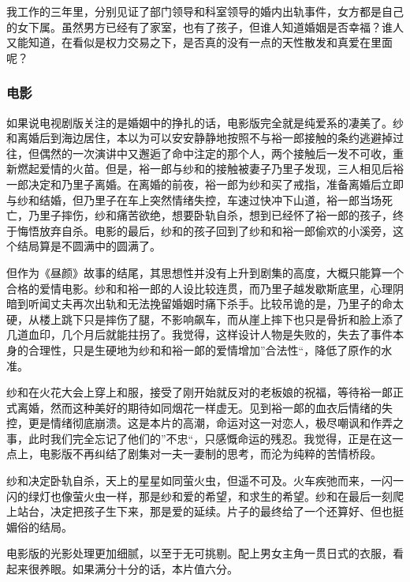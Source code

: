 我工作的三年里，分别见证了部门领导和科室领导的婚内出轨事件，女方都是自己的女下属。虽然男方已经有了家室，也有了孩子，但谁人知道婚姻是否幸福？谁人又能知道，在看似是权力交易之下，是否真的没有一点的天性散发和真爱在里面呢？

\subsubsection{电影}
如果说电视剧版关注的是婚姻中的挣扎的话，电影版完全就是纯爱系的凄美了。纱和离婚后到海边居住，本以为可以安安静静地按照不与裕一郎接触的条约逃避掉过往，但偶然的一次演讲中又邂逅了命中注定的那个人，两个接触后一发不可收，重新燃起爱情的火苗。但是，裕一郎与纱和的接触被妻子乃里子发现，三人相见后裕一郎决定和乃里子离婚。在离婚的前夜，裕一郎为纱和买了戒指，准备离婚后立即与纱和结婚，但乃里子在车上突然情绪失控，车速过快冲下山道，裕一郎当场死亡，乃里子摔伤，纱和痛苦欲绝，想要卧轨自杀，想到已经怀了裕一郎的孩子，终于悔悟放弃自杀。电影的最后，纱和的孩子回到了纱和和裕一郎偷欢的小溪旁，这个结局算是不圆满中的圆满了。

但作为《昼颜》故事的结尾，其思想性并没有上升到剧集的高度，大概只能算一个合格的爱情电影。纱和和裕一郎的人设比较连贯，而乃里子越发歇斯底里，心理阴暗到听闻丈夫再次出轨和无法挽留婚姻时痛下杀手。比较吊诡的是，乃里子的命太硬，从楼上跳下只是摔伤了腿，不影响飙车，而从崖上摔下也只是骨折和脸上添了几道血印，几个月后就能拄拐了。我觉得，这样设计人物是失败的，失去了事件本身的合理性，只是生硬地为纱和和裕一郞的爱情增加”合法性“，降低了原作的水准。

纱和在火花大会上穿上和服，接受了刚开始就反对的老板娘的祝福，等待裕一郞正式离婚，然而这种美好的期待如同烟花一样虚无。见到裕一郞的血衣后情绪的失控，更是情绪彻底崩溃。这是本片的高潮，命运对这一对恋人，极尽嘲讽和作弄之事，此时我们完全忘记了他们的”不忠“，只感慨命运的残忍。我觉得，正是在这一点上，电影版不再纠结了剧集对一夫一妻制的思考，而沦为纯粹的苦情桥段。

纱和决定卧轨自杀，天上的星星如同萤火虫，但遥不可及。火车疾弛而来，一闪一闪的绿灯也像萤火虫一样，那是纱和爱的希望，和求生的希望。纱和在最后一刻爬上站台，决定把孩子生下来，那是爱的延续。片子的最终给了一个还算好、但也挺媚俗的结局。

电影版的光影处理更加细腻，以至于无可挑剔。配上男女主角一贯日式的衣服，看起来很养眼。如果满分十分的话，本片值六分。